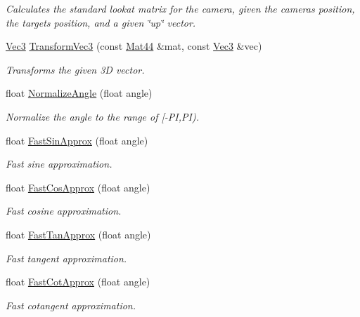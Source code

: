 \begin{DoxyCompactItemize}
\begin{DoxyCompactList}\small\item\em Calculates the standard lookat matrix for the camera, given the camera\textquotesingle{}s position, the target\textquotesingle{}s position, and a given \char`\"{}up\char`\"{} vector. \end{DoxyCompactList}\item 
\hyperlink{classgfxmath_1_1_vec3}{Vec3} \hyperlink{namespacegfxmath_a503b30792d41234b29089176be81cf6c}{Transform\+Vec3} (const \hyperlink{classgfxmath_1_1_mat44}{Mat44} \&mat, const \hyperlink{classgfxmath_1_1_vec3}{Vec3} \&vec)
\begin{DoxyCompactList}\small\item\em Transforms the given 3\+D vector. \end{DoxyCompactList}\item 
float \hyperlink{group___s_i_s_d_scalar_math_ga9ae15ff8e8601f2ed5381a5bce08d289}{Normalize\+Angle} (float angle)
\begin{DoxyCompactList}\small\item\em Normalize the angle to the range of \mbox{[}-\/\+P\+I,P\+I). \end{DoxyCompactList}\item 
float \hyperlink{group___s_i_s_d_scalar_math_gafb36256c1573aa72d03c3567f955bd83}{Fast\+Sin\+Approx} (float angle)
\begin{DoxyCompactList}\small\item\em Fast sine approximation. \end{DoxyCompactList}\item 
float \hyperlink{group___s_i_s_d_scalar_math_ga5c9038d14fbd579ef9860351b41fbf95}{Fast\+Cos\+Approx} (float angle)
\begin{DoxyCompactList}\small\item\em Fast cosine approximation. \end{DoxyCompactList}\item 
float \hyperlink{group___s_i_s_d_scalar_math_gae63b81e8a10d131334205c50b9b2166d}{Fast\+Tan\+Approx} (float angle)
\begin{DoxyCompactList}\small\item\em Fast tangent approximation. \end{DoxyCompactList}\item 
float \hyperlink{group___s_i_s_d_scalar_math_gab16e2d48a3790c9f448feefe7192dbe1}{Fast\+Cot\+Approx} (float angle)
\begin{DoxyCompactList}\small\item\em Fast cotangent approximation. \end{DoxyCompactList}\item 

\end{DoxyCompactItemize}
